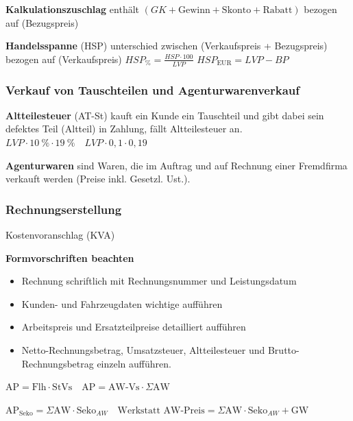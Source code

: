 \textbf{Kalkulationszuschlag} enthält
$(GK + \text{Gewinn} + \text{Skonto} + \text{Rabatt})$ bezogen auf
(Bezugspreis)

\textbf{Handelsspanne} (HSP) unterschied zwischen (Verkaufspreis +
Bezugspreis) bezogen auf (Verkaufspreis)
$\boxed{HSP_\% = \frac{HSP \cdot 100}{LVP}}$
$\boxed{HSP_\text{EUR} = LVP - BP}$

\subsubsection{Verkauf von Tauschteilen und
Agenturwarenverkauf}\label{verkauf-von-tauschteilen-und-agenturwarenverkauf}

\textbf{Altteilesteuer} (AT-St) kauft ein Kunde ein Tauschteil und gibt
dabei sein defektes Teil (Altteil) in Zahlung, fällt Altteilesteuer an.
$\boxed{LVP \cdot 10~\% \cdot 19~\%} \quad \boxed{LVP \cdot 0,1 \cdot 0,19}$

\textbf{Agenturwaren} sind Waren, die im Auftrag und auf Rechnung einer
Fremdfirma verkauft werden (Preise inkl. Gesetzl. Ust.).

\subsubsection{Rechnungserstellung}\label{rechnungserstellung}

Kostenvoranschlag (KVA)

\textbf{Formvorschriften beachten}

\begin{itemize}
\item
  Rechnung schriftlich mit Rechnungsnummer und Leistungsdatum
\item
  Kunden- und Fahrzeugdaten wichtige aufführen
\item
  Arbeitspreis und Ersatzteilpreise detailliert aufführen
\item
  Netto-Rechnungsbetrag, Umsatzsteuer, Altteilesteuer und
  Brutto-Rechnungsbetrag einzeln aufführen.
\end{itemize}

$\text{AP} = \text{Flh} \cdot \text{StVs} \quad \text{AP} = \text{AW-Vs} \cdot \Sigma \text{AW}$

$\text{AP}_\text{Seko} = \Sigma \text{AW} \cdot \text{Seko}_{AW} \quad \text{Werkstatt AW-Preis} = \Sigma \text{AW} \cdot \text{Seko}_{AW} + \text{GW}$

